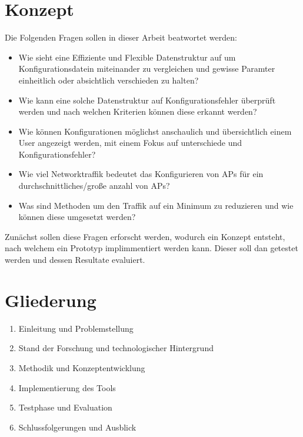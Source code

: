 \section{Konzept}
Die Folgenden Fragen sollen in dieser Arbeit beatwortet werden:
\begin{itemize}
  \item Wie sieht eine Effiziente und Flexible Datenstruktur auf um Konfigurationsdatein miteinander zu vergleichen und gewisse Paramter einheitlich oder absichtlich verschieden zu halten?
  \item Wie kann eine solche Datenstruktur auf Konfigurationsfehler überprüft werden und nach welchen Kriterien können diese erkannt werden?
  \item Wie können Konfigurationen möglichst anschaulich und übersichtlich einem User angezeigt werden, mit einem Fokus auf unterschiede und Konfigurationsfehler?
  \item Wie viel Networktraffik bedeutet das Konfigurieren von APs für ein durchschnittliches/große anzahl von APs?
  \item Was sind Methoden um den Traffik auf ein Minimum zu reduzieren und wie können diese umgesetzt werden?
\end{itemize}
Zunächst sollen diese Fragen erforscht werden, wodurch ein Konzept entsteht, nach welchem ein Prototyp implimmentiert werden kann.
Dieser soll dan getestet werden und dessen Resultate evaluiert.
\section{Gliederung}
\begin{enumerate}
  \item Einleitung und Problemstellung
  \item Stand der Forschung und technologischer Hintergrund
  \item Methodik und Konzeptentwicklung
  \item Implementierung des Tools
  \item Testphase und Evaluation
  \item Schlussfolgerungen und Ausblick
\end{enumerate}

